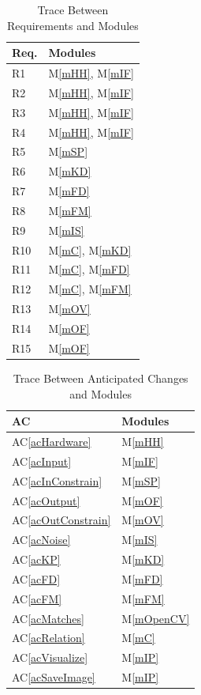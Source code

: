 \documentclass[12pt, titlepage]{article}
\newcommand{\acref}[1]{AC\ref{#1}}
\newcommand{\mref}[1]{M\ref{#1}}
\begin{document}
\begin{table}[H]
\centering
\begin{tabular}{p{} p{}}
\toprule
\textbf{Req.} & \textbf{Modules}\\
\midrule
R1 & \mref{mHH}, \mref{mIF}\\
R2 & \mref{mHH}, \mref{mIF}\\
R3 & \mref{mHH}, \mref{mIF}\\
R4 & \mref{mHH}, \mref{mIF}\\
R5 & \mref{mSP}\\
R6 & \mref{mKD}\\
R7 & \mref{mFD}\\
R8 & \mref{mFM}\\
R9 & \mref{mIS}\\
R10 & \mref{mC}, \mref{mKD}\\
R11 & \mref{mC}, \mref{mFD}\\
R12 & \mref{mC}, \mref{mFM}\\
R13 & \mref{mOV}\\
R14 & \mref{mOF}\\
R15 & \mref{mOF}\\
\bottomrule
\end{tabular}
\caption{Trace Between Requirements and Modules}
\label{TblRT}
\end{table}

\begin{table}[H]
\centering
\begin{tabular}{p{} p{}}
\toprule
\textbf{AC} & \textbf{Modules}\\
\midrule
\acref{acHardware} & \mref{mHH}\\
\acref{acInput} & \mref{mIF}\\
\acref{acInConstrain} & \mref{mSP}\\
\acref{acOutput} & \mref{mOF}\\
\acref{acOutConstrain} & \mref{mOV}\\
\acref{acNoise} & \mref{mIS}\\
\acref{acKP} & \mref{mKD}\\
\acref{acFD} & \mref{mFD}\\
\acref{acFM} & \mref{mFM}\\
\acref{acMatches} & \mref{mOpenCV}\\
\acref{acRelation} & \mref{mC}\\
\acref{acVisualize} & \mref{mIP}\\
\acref{acSaveImage} & \mref{mIP}\\
\bottomrule
\end{tabular}
\caption{Trace Between Anticipated Changes and Modules}
\label{TblACT}
\end{table}
\end{document}

